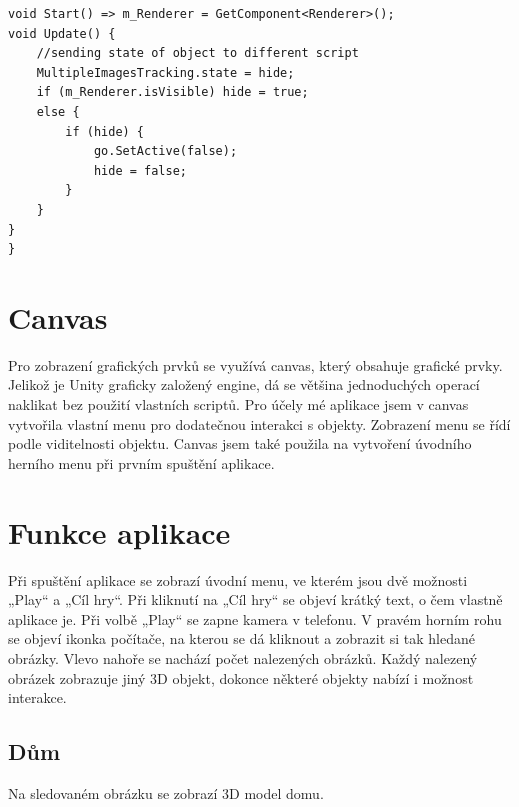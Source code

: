 \documentclass[12pt, a4paper,
twoside,        %
openright
]{report}
\begin{document}
\begin{lstlisting}[style=csh, caption={Ukázka kódu zjišťování viditelnosti objektu.}]
 void Start() => m_Renderer = GetComponent<Renderer>();
void Update() {
	//sending state of object to different script
	MultipleImagesTracking.state = hide;
	if (m_Renderer.isVisible) hide = true;
	else {
		if (hide) {
			go.SetActive(false);
			hide = false;
		}
	}
}
}
\end{lstlisting}


\section{Canvas}
\label{sec:canvas}
Pro zobrazení grafických prvků se využívá canvas, který obsahuje grafické prvky. Jelikož je Unity graficky založený engine, dá se většina jednoduchých operací naklikat bez použití vlastních scriptů. Pro účely mé aplikace jsem v canvas vytvořila vlastní menu pro dodatečnou interakci s objekty. Zobrazení menu se řídí podle viditelnosti objektu. Canvas jsem také použila na vytvoření úvodního herního menu při prvním spuštění aplikace. 



\section{Funkce aplikace}
\label{funkce_aplikace}
Při spuštění aplikace se zobrazí úvodní menu, ve kterém jsou dvě možnosti „Play“ a „Cíl hry“. Při kliknutí na „Cíl hry“ se objeví krátký text, o čem vlastně aplikace je. 
Při volbě „Play“ se zapne kamera v telefonu. V pravém horním rohu se objeví ikonka počítače, na kterou se dá kliknout a zobrazit si tak hledané obrázky. Vlevo nahoře se nachází počet nalezených obrázků. 
Každý nalezený obrázek zobrazuje jiný 3D objekt, dokonce některé objekty nabízí i možnost interakce. 

\subsection{Dům}
Na sledovaném obrázku se zobrazí 3D model domu.  
\end{document}
